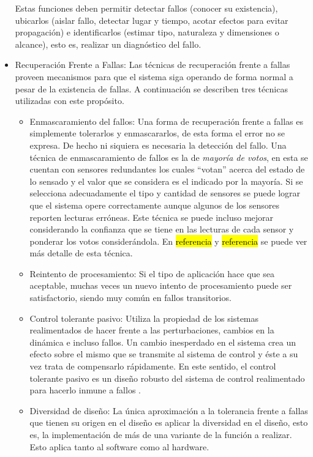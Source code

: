 \documentclass[withindex,glossary]{cam-thesis}
\begin{document}
\begin{itemize}
Estas funciones deben permitir detectar fallos (conocer su existencia), ubicarlos (aislar fallo, detectar lugar y tiempo, acotar efectos para evitar propagación) e identificarlos (estimar tipo, naturaleza y dimensiones o alcance), esto es, realizar un diagnóstico del fallo.
\item Recuperación Frente a Fallas: Las técnicas de recuperación frente a fallas proveen mecanismos para que el sistema siga operando de forma normal a pesar de la existencia de fallas. A continuación se describen tres técnicas utilizadas con este propósito.
	\begin{itemize}
		\item Enmascaramiento del fallos: Una forma de recuperación frente a fallas es simplemente tolerarlos y enmascararlos, de esta forma el error no se expresa. De hecho ni siquiera es necesaria la detección del fallo. Una técnica de enmascaramiento de fallos es la de \textit{mayoría de votos}, en esta se cuentan con sensores redundantes los cuales ``votan'' acerca del estado de lo sensado y el valor que se considera es el indicado por la mayoría. Si se selecciona adecuadamente el tipo y cantidad de sensores se puede lograr que el sistema opere correctamente aunque algunos de los sensores reporten lecturas erróneas. Este técnica se puede incluso mejorar considerando la confianza que se tiene en las lecturas de cada sensor y ponderar los votos considerándola. En \hl{referencia} y \hl{referencia} se puede ver más detalle de esta técnica.
		\item Reintento de procesamiento: Si el tipo de aplicación hace que sea aceptable, muchas veces un nuevo intento de procesamiento puede ser satisfactorio, siendo muy común en fallos transitorios.
		\item Control tolerante pasivo: Utiliza la propiedad de los sistemas realimentados de hacer frente a las perturbaciones, cambios en la dinámica e incluso fallos. Un cambio inesperdado en el sistema crea un efecto sobre el mismo que se transmite al sistema de control y éste a su vez trata de compensarlo rápidamente. En este sentido, el control tolerante pasivo es un diseño robusto del sistema de control realimentado para hacerlo inmune a fallos \cite{PATTON19971029}.
		\item Diversidad de diseño: La única aproximación a la tolerancia frente a fallas que tienen su origen en el diseño es aplicar la diversidad en el diseño, esto es, la implementación de más de una variante de la función a realizar. Esto aplica tanto al software como al hardware. 
	\end{itemize}

\end{itemize}
\end{document}
